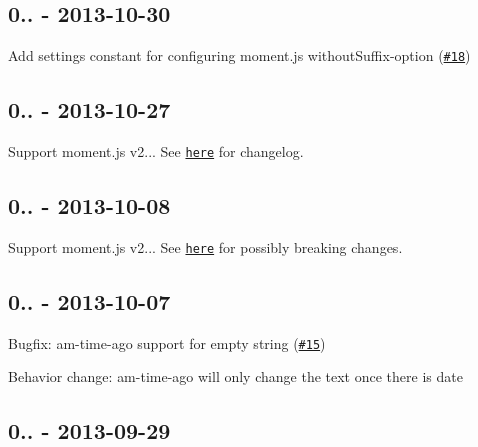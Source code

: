 \subsection*{0.. -\/ 2013-\/10-\/30}


\begin{DoxyItemize}
\item Add settings constant for configuring moment.\+js without\+Suffix-\/option (\href{https://github.com/urish/angular-moment/pull/18}{\tt \#18})
\end{DoxyItemize}

\subsection*{0.. -\/ 2013-\/10-\/27}


\begin{DoxyItemize}
\item Support moment.\+js v2... See \href{https://github.com/moment/moment/#240}{\tt here} for changelog.
\end{DoxyItemize}

\subsection*{0.. -\/ 2013-\/10-\/08}


\begin{DoxyItemize}
\item Support moment.\+js v2... See \href{https://gist.github.com/ichernev/6864354}{\tt here} for possibly breaking changes.
\end{DoxyItemize}

\subsection*{0.. -\/ 2013-\/10-\/07}


\begin{DoxyItemize}
\item Bugfix\+: {\ttfamily am-\/time-\/ago} support for empty string (\href{https://github.com/urish/angular-moment/issues/15}{\tt \#15})
\item Behavior change\+: {\ttfamily am-\/time-\/ago} will only change the text once there is date
\end{DoxyItemize}

\subsection*{0.. -\/ 2013-\/09-\/29}


